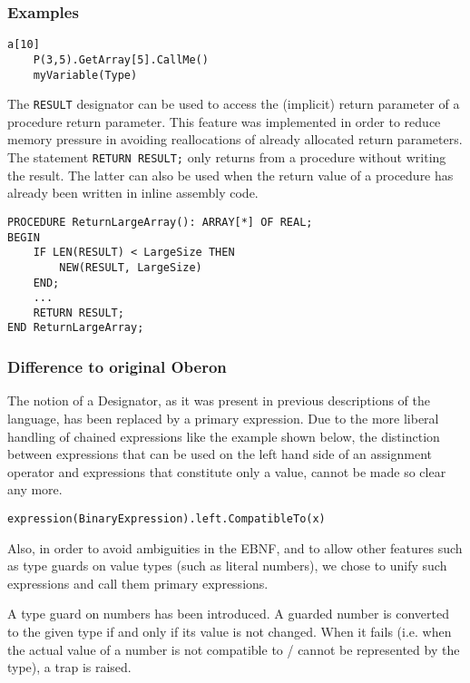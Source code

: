 \documentclass[a4wide,11pt]{article}
\begin{document}
\begin{annotation}
\subsubsection{Examples}
\begin{lstlisting}[style=example,caption=Example of Designators]
	a[10]
	P(3,5).GetArray[5].CallMe()
	myVariable(Type)
\end{lstlisting}

The \lstinline"RESULT" designator can be used to access the (implicit) return parameter of a procedure return parameter.
This feature was implemented in order to reduce memory pressure in avoiding reallocations of already allocated return parameters.
The statement \lstinline"RETURN RESULT;" only returns from a procedure without writing the result.
The latter can also be used when the return value of a procedure has already been written in inline assembly code.
\begin{lstlisting}[style=example]
PROCEDURE ReturnLargeArray(): ARRAY[*] OF REAL;
BEGIN
	IF LEN(RESULT) < LargeSize THEN
		NEW(RESULT, LargeSize)
	END;
	...
	RETURN RESULT;
END ReturnLargeArray;
\end{lstlisting}

\subsubsection{Difference to original Oberon}
The notion of a Designator, as it was present in previous descriptions of the language, has been replaced by a primary expression.
Due to the more liberal handling of chained expressions like the example shown below, the distinction between expressions that can be used on the left hand side of an assignment operator and expressions that constitute only a value, cannot be made so clear any more.
\begin{lstlisting}[style=example]
expression(BinaryExpression).left.CompatibleTo(x)
\end{lstlisting}

Also, in order to avoid ambiguities in the EBNF, and to allow other features such as type guards on value types (such as literal numbers), we chose to unify such expressions and call them primary expressions.

A type guard on numbers has been introduced.
A guarded number is converted to the given type if and only if its value is not changed.
When it fails (i.e. when the actual value of a number is not compatible to / cannot be represented by the type), a trap is raised.


\end{annotation}
\end{document}
